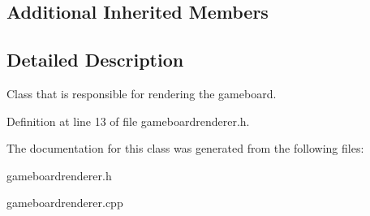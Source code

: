 \subsection*{Additional Inherited Members}


\subsection{Detailed Description}
Class that is responsible for rendering the gameboard. 

Definition at line 13 of file gameboardrenderer.\-h.



The documentation for this class was generated from the following files\-:\begin{DoxyCompactItemize}
\item 
gameboardrenderer.\-h\item 
gameboardrenderer.\-cpp\end{DoxyCompactItemize}
